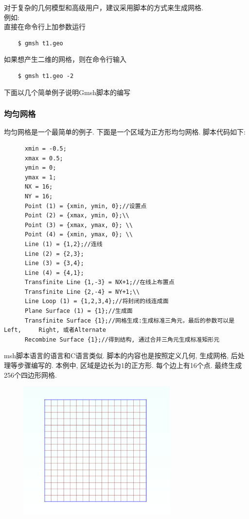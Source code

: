 \documentclass[12pt]{article}
\begin{document}
\begin{CJK}{UTF8}{gkai}
	对于复杂的几何模型和高级用户，建议采用脚本的方式来生成网格.\\	
	例如:\\	
	直接在命令行上加参数运行	
	\begin{verbatim}
	$ gmsh t1.geo
	\end{verbatim}
	
	如果想产生二维的网格，则在命令行输入
	\begin{verbatim}
	$ gmsh t1.geo -2
	\end{verbatim}
	
    下面以几个简单例子说明Gmsh脚本的编写\\
    \subsubsection{均匀网格}
    均匀网格是一个最简单的例子. 下面是一个区域为正方形均匀网格. 脚本代码如下:\\
    \begin{verbatim}
      xmin = -0.5;
      xmax = 0.5;
      ymin = 0;
      ymax = 1; 
      NX = 16;
      NY = 16;
      Point (1) = {xmin, ymin, 0};//设置点 
      Point (2) = {xmax, ymin, 0};\\ 
      Point (3) = {xmax, ymax, 0}; \\
      Point (4) = {xmin, ymax, 0}; \\
      Line (1) = {1,2};//连线      
      Line (2) = {2,3};
      Line (3) = {3,4}; 
      Line (4) = {4,1};
      Transfinite Line {1,-3} = NX+1;//在线上布置点 
      Transfinite Line {2,-4} = NY+1;\\
      Line Loop (1) = {1,2,3,4};//将封闭的线连成面
      Plane Surface (1) = {1};//生成面
      Transfinite Surface {1};//网格生成:生成标准三角元，最后的参数可以是Left,     Right, 或者Alternate  
      Recombine Surface {1};//得到结构, 通过合并三角元生成标准矩形元
    \end{verbatim}
 
 msh脚本语言的语言和C语言类似. 脚本的内容也是按照定义几何, 生成网格, 后处理等步骤编写的. 本例中, 区域是边长为1的正方形. 每个边上有16个点. 最终生成256个四边形网格. \\
\begin{figure}[H]
	\centering
	\includegraphics[width=8cm]{1.png}
	\caption{}  		
\end{figure}

\end{CJK}
\end{document}

